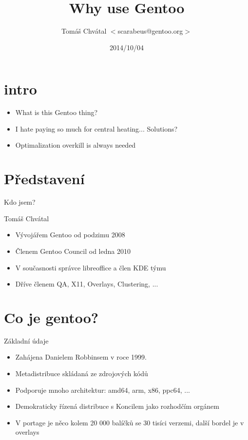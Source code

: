 \documentclass{beamer}
\title{Why use Gentoo}
\author[Tomáš Chvátal]{Tomáš Chvátal $<$scarabeus@gentoo.org$>$}
\date{2014/10/04}
\begin{document}
\frame{\titlepage}
\section{intro}
\begin{frame}
\begin{itemize}
	\item What is this Gentoo thing?
	\item I hate paying so much for central heating... Solutions?
	\item Optimalization overkill is always needed
\end{itemize}
\end{frame}

\section{Představení}
\begin{frame}{Kdo jsem?}
	\begin{center}Tomáš Chvátal\end{center}
	\begin{itemize}
		\item Vývojářem Gentoo od podzimu 2008
		\item Členem Gentoo Council od ledna 2010
		\item V současnosti správce libreoffice a člen KDE týmu
		\item Dříve členem QA, X11, Overlays, Clustering, ...
	\end{itemize}
\end{frame}
\section{Co je gentoo?}

\begin{frame}{Základní údaje}
	\begin{itemize}
		\item Zahájena Danielem Robbinsem v roce 1999.
		\item Metadistribuce skládaná ze zdrojových kódů
		\item Podporuje mnoho architektur: amd64, arm, x86, ppc64, ...
		\item Demokraticky řízená distribuce s Koncilem jako rozhodčím orgánem
		\item V portage je něco kolem 20 000 balíčků se 30 tisíci verzemi, další bordel je v overlays
	\end{itemize}
\end{frame}
\end{document}
